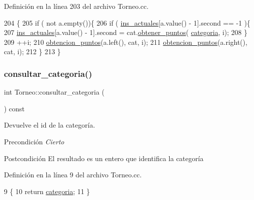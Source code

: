 Definición en la línea 203 del archivo Torneo.\+cc.


\begin{DoxyCode}
204 \{
205   \textcolor{keywordflow}{if} ( not a.empty())\{
206     \textcolor{keywordflow}{if} ( \hyperlink{class_torneo_a2293acd2d9d04bdefc603ab4cdce2c5a}{ins\_actuales}[a.value() - 1].second == -1 )\{
207       \hyperlink{class_torneo_a2293acd2d9d04bdefc603ab4cdce2c5a}{ins\_actuales}[a.value() - 1].second = cat.\hyperlink{class_cjt__categorias_abddf6d1471987a718e12485f58b95c1b}{obtener\_puntos}(
      \hyperlink{class_torneo_ad9bec7ef311a416138abb99f3a487b3e}{categoria}, i);
208     \}
209     ++i;
210     \hyperlink{class_torneo_a5ee0c8ca296bf422d040b05c768f7ba0}{obtencion\_puntos}(a.left(), cat, i);
211     \hyperlink{class_torneo_a5ee0c8ca296bf422d040b05c768f7ba0}{obtencion\_puntos}(a.right(), cat, i);
212   \}
213 \}
\end{DoxyCode}
\mbox{\label{class_torneo_ac558198d579c88ab11b873ed3cf0953d}} 
\subsubsection{\texorpdfstring{consultar\+\_\+categoria()}{consultar\_categoria()}}
{\footnotesize\ttfamily int Torneo\+::consultar\+\_\+categoria (\begin{DoxyParamCaption}{ }\end{DoxyParamCaption}) const}



Devuelve el id de la categoría. 

\begin{DoxyPrecond}{Precondición}
{\itshape Cierto} 
\end{DoxyPrecond}
\begin{DoxyPostcond}{Postcondición}
El resultado es un entero que identifica la categoría 
\end{DoxyPostcond}


Definición en la línea 9 del archivo Torneo.\+cc.


\begin{DoxyCode}
9                                       \{
10   \textcolor{keywordflow}{return} \hyperlink{class_torneo_ad9bec7ef311a416138abb99f3a487b3e}{categoria};
11 \}
\end{DoxyCode}
\mbox{\label{class_torneo_a817ee4377de539e5292eb1491d2f9b29}} 
